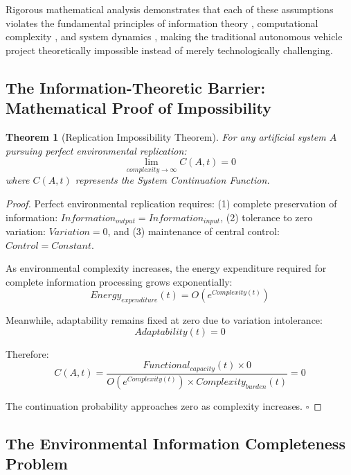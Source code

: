 \documentclass[12pt,a4paper]{article}
\newtheorem{theorem}{Theorem}[section]
\begin{document}
Rigorous mathematical analysis demonstrates that each of these assumptions violates the fundamental principles of information theory \cite{shannon1948,cover1991}, computational complexity \cite{garey1979,sipser2006}, and system dynamics \cite{strogatz2014,luenberger1979}, making the traditional autonomous vehicle project theoretically impossible instead of merely technologically challenging.

\subsection{The Information-Theoretic Barrier: Mathematical Proof of Impossibility}

\begin{theorem}[Replication Impossibility Theorem]
For any artificial system $A$ pursuing perfect environmental replication:
\begin{equation}
\lim_{complexity \to \infty} C(A,t) = 0
\end{equation}
where $C(A,t)$ represents the System Continuation Function.
\end{theorem}

\begin{proof}
Perfect environmental replication requires: (1) complete preservation of information: $Information_{output} = Information_{input}$, (2) tolerance to zero variation: $Variation = 0$, and (3) maintenance of central control: $Control = Constant$.

As environmental complexity increases, the energy expenditure required for complete information processing grows exponentially:
\begin{equation}
Energy_{expenditure}(t) = O(e^{Complexity(t)})
\end{equation}

Meanwhile, adaptability remains fixed at zero due to variation intolerance:
\begin{equation}
Adaptability(t) = 0
\end{equation}

Therefore:
\begin{equation}
C(A,t) = \frac{Functional_{capacity}(t) \times 0}{O(e^{Complexity(t)}) \times Complexity_{burden}(t)} = 0
\end{equation}

The continuation probability approaches zero as complexity increases. $\square$
\end{proof}

\subsection{The Environmental Information Completeness Problem}
\end{document}
